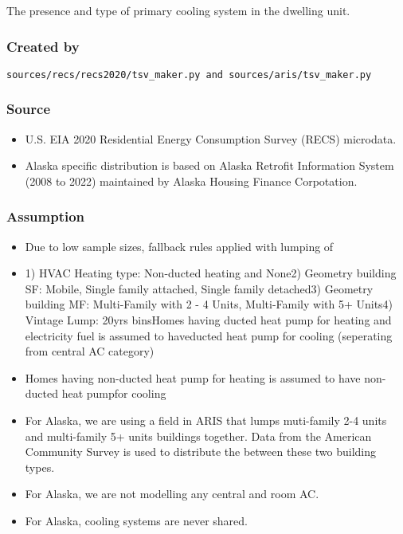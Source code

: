 The presence and type of primary cooling system in the dwelling unit.

\subsubsection{Created by}\label{created-by-66}

\texttt{sources/recs/recs2020/tsv\_maker.py\ and\ sources/aris/tsv\_maker.py}

\subsubsection{Source}\label{source-65}

\begin{itemize}
 
\item
  U.S. EIA 2020 Residential Energy Consumption Survey (RECS) microdata.
\item
  Alaska specific distribution is based on Alaska Retrofit Information
  System (2008 to 2022) maintained by Alaska Housing Finance
  Corpotation.
\end{itemize}

\subsubsection{Assumption}\label{assumption-38}

\begin{itemize}
 
\item
  Due to low sample sizes, fallback rules applied with lumping of
\item
  1) HVAC Heating type: Non-ducted heating and None2) Geometry building
  SF: Mobile, Single family attached, Single family detached3) Geometry
  building MF: Multi-Family with 2 - 4 Units, Multi-Family with 5+
  Units4) Vintage Lump: 20yrs binsHomes having ducted heat pump for
  heating and electricity fuel is assumed to haveducted heat pump for
  cooling (seperating from central AC category)
\item
  Homes having non-ducted heat pump for heating is assumed to have
  non-ducted heat pumpfor cooling
\item
  For Alaska, we are using a field in ARIS that lumps muti-family 2-4
  units and multi-family 5+ units buildings together. Data from the
  American Community Survey is used to distribute the between these two
  building types.
\item
  For Alaska, we are not modelling any central and room AC.
\item
  For Alaska, cooling systems are never shared.
\end{itemize}

